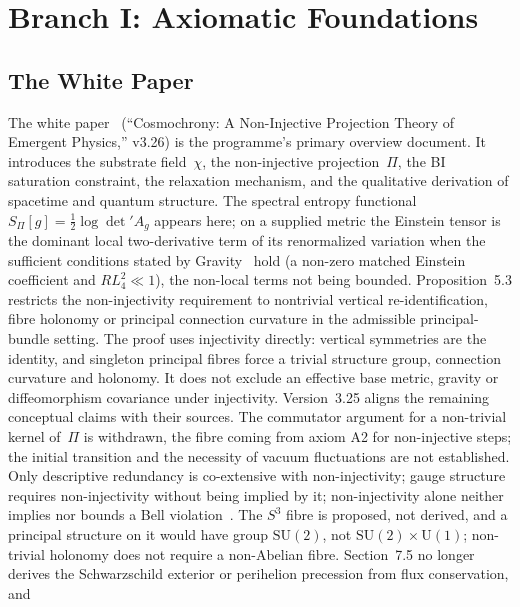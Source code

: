 \documentclass[11pt,a4paper]{article}
\begin{document}
  \section{Branch I: Axiomatic Foundations}
  \label{sec:foundations}

  \subsection{The White Paper}

    The white paper~\cite{Cosmochrony} (``Cosmochrony: A Non-Injective Projection Theory of Emergent
  Physics,'' v3.26) is the programme's primary overview document.
    It introduces the substrate field~$\chi$, the non-injective projection~$\Pi$, the BI saturation
    constraint, the relaxation mechanism, and the qualitative derivation of spacetime and quantum structure.
    The spectral entropy functional $S_\Pi[g] = \tfrac{1}{2}\log\det' A_g$ appears here; on a supplied metric
    the Einstein tensor is the dominant local two-derivative term of its renormalized variation when the
    sufficient conditions stated by Gravity~\cite{Beau2026h} hold (a non-zero matched Einstein coefficient and
    $R L_4^2 \ll 1$), the non-local terms not being bounded.
    Proposition~5.3 restricts the non-injectivity requirement to nontrivial vertical re-identification,
    fibre holonomy or principal connection curvature in the admissible principal-bundle setting.
    The proof uses injectivity directly: vertical symmetries are the identity, and singleton principal fibres
    force a trivial structure group, connection curvature and holonomy.
    It does not exclude an effective base metric, gravity or diffeomorphism covariance under injectivity.
    Version~3.25 aligns the remaining conceptual claims with their sources.
    The commutator argument for a non-trivial kernel of~$\Pi$ is withdrawn, the fibre coming from axiom A2 for
    non-injective steps; the initial transition and the necessity of vacuum fluctuations are not established.
    Only descriptive redundancy is co-extensive with non-injectivity; gauge structure requires non-injectivity
    without being implied by it; non-injectivity alone neither implies nor bounds a Bell
    violation~\cite{Beau2026BellNoGo}.
    The $S^3$ fibre is proposed, not derived, and a principal structure on it would have group $\mathrm{SU}(2)$, not
    $\mathrm{SU}(2)\times\mathrm{U}(1)$; non-trivial holonomy does not require a non-Abelian fibre.
    Section~7.5 no longer derives the Schwarzschild exterior or perihelion precession from flux conservation, and
\end{document}
